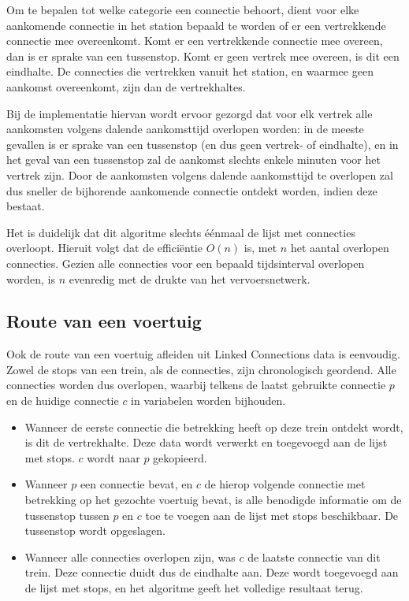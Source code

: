 Om te bepalen tot welke categorie een connectie behoort, dient voor elke aankomende connectie in het station bepaald te worden of er een vertrekkende connectie mee overeenkomt. Komt er een vertrekkende connectie mee overeen, dan is er sprake van een tussenstop. Komt er geen vertrek mee overeen, is dit een eindhalte. De connecties die vertrekken vanuit het station, en waarmee geen aankomst overeenkomt, zijn dan de vertrekhaltes. 

Bij de implementatie hiervan wordt ervoor gezorgd dat voor elk vertrek alle aankomsten volgens dalende aankomsttijd overlopen worden: in de meeste gevallen is er sprake van een tussenstop (en dus geen vertrek- of eindhalte), en in het geval van een tussenstop zal de aankomst slechts enkele minuten voor het vertrek zijn. Door de aankomsten volgens dalende aankomsttijd te overlopen zal dus sneller de bijhorende aankomende connectie ontdekt worden, indien deze bestaat.

Het is duidelijk dat dit algoritme slechts éénmaal de lijst met connecties overloopt. Hieruit volgt dat de efficiëntie $O(n)$ is, met $n$ het aantal overlopen connecties. Gezien alle connecties voor een bepaald tijdsinterval overlopen worden, is $n$ evenredig met de drukte van het vervoersnetwerk.

\subsection{Route van een voertuig}

Ook de route van een voertuig afleiden uit Linked Connections data is eenvoudig. Zowel de stops van een trein, als de connecties, zijn chronologisch geordend. Alle connecties worden dus overlopen, waarbij telkens de laatst gebruikte connectie $p$ en de huidige connectie $c$ in variabelen worden bijhouden. 
\begin{itemize}
	\item Wanneer de eerste connectie  die betrekking heeft op deze trein ontdekt wordt, is dit de vertrekhalte. Deze data wordt verwerkt en toegevoegd aan de lijst met stops. $c$ wordt naar $p$ gekopieerd.
	\item Wanneer $p$ een connectie bevat, en $c$ de hierop volgende connectie met betrekking op het gezochte voertuig bevat, is alle benodigde informatie om de tussenstop tussen $p$ en $c$ toe te voegen aan de lijst met stops beschikbaar. De tussenstop wordt opgeslagen.
	\item Wanneer alle connecties overlopen zijn, was $c$ de laatste connectie van dit trein. Deze connectie duidt dus de eindhalte aan. Deze wordt toegevoegd aan de lijst met stops, en het algoritme geeft het volledige resultaat terug.
\end{itemize}

